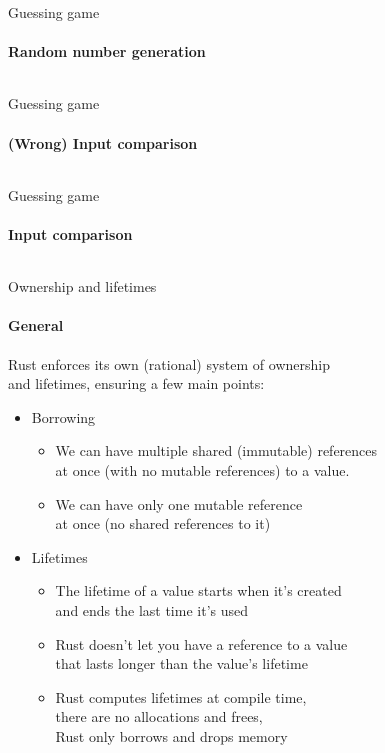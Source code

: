 \documentclass[usenames,dvipsnames,10pt,aspectratio=169]{beamer}
\begin{document}
\begin{frame}{Guessing game}
	\framesubtitle{Random number generation}
	\inputminted[fontsize=\footnotesize]{c}{code/guess2.rs}
\end{frame}

\begin{frame}{Guessing game}
	\framesubtitle{(Wrong) Input comparison}
	\inputminted[fontsize=\normalsize]{c}{code/guess3.rs}
\end{frame}

\begin{frame}{Guessing game}
	\framesubtitle{Input comparison}
	\inputminted[fontsize=\normalsize]{c}{code/guess4.rs}
\end{frame}

\begin{frame}{Ownership and lifetimes}
	\framesubtitle{General}
	\normalsize
	Rust enforces its own (rational) system of ownership\\
	and lifetimes, ensuring a few main points:
	\begin{itemize}
		\item Borrowing
		\begin{itemize}
			\item We can have multiple shared (immutable) references\\
				at once (with no mutable references) to a value.
			\item We can have only one mutable reference\\
				at once (no shared references to it)
		\end{itemize}
		\item Lifetimes
		\begin{itemize}
			\item The lifetime of a value starts when it’s created\\
				and ends the last time it’s used
			\item Rust doesn’t let you have a reference to a value\\
				that lasts longer than the value’s lifetime
			\item Rust computes lifetimes at compile time,\\
				there are no allocations and frees,\\
				Rust only borrows and drops memory
		\end{itemize}
	\end{itemize}
\end{frame}
\end{document}
